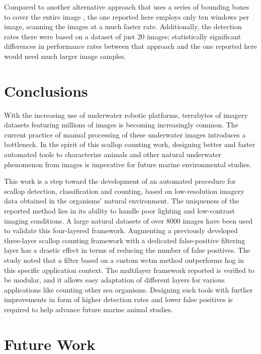 \documentclass {udthesis}
\begin{document}
Compared to another alternative approach that uses a series of bounding boxes to cover the entire image \cite{guomundsson}, the one reported here employs only ten windows per image, scanning the images at a much faster rate.   
Additionally, the detection rates there \cite{guomundsson} were based on a dataset of just 20 images; statistically significant differences in performance rates between that approach and the one reported here would need much larger image samples.

\section{Conclusions}

With the increasing use of underwater robotic platforms, terrabytes of imagery datasets featuring millions of images is becoming increasingly common. 
The current practice of manual processing of these underwater images introduces a bottleneck. 
In the spirit of this scallop counting work, designing better and faster automated tools  to characterize animals and other natural underwater phenomenon from images is imperative for future marine environmental studies.

This work is a step toward
the development of an automated procedure for scallop detection, classification
and counting, based on low-resolution imagery data obtained in the organisms' natural environment.
The uniqueness of the reported method lies in its ability to handle poor lighting and low-contrast imaging conditions.
A large natural datasets of over 8000 images have been used to validate this four-layered framework.
Augmenting a previously developed three-layer scallop counting framework with a dedicated false-positive filtering layer has a drastic effect in terms of reducing the number of false positives.
The study noted that a filter based on a custom \gls{wctm} method outperforms \gls{hog} in  this specific application context. 
The multilayer framework reported is verified to be modular, and it allows easy adaptation of different layers for various applications like counting other sea organisms. 
Designing such tools with further improvements in form of higher detection rates and lower false positives is required to help advance future marine animal studies.

\section{Future Work}
\end{document}
